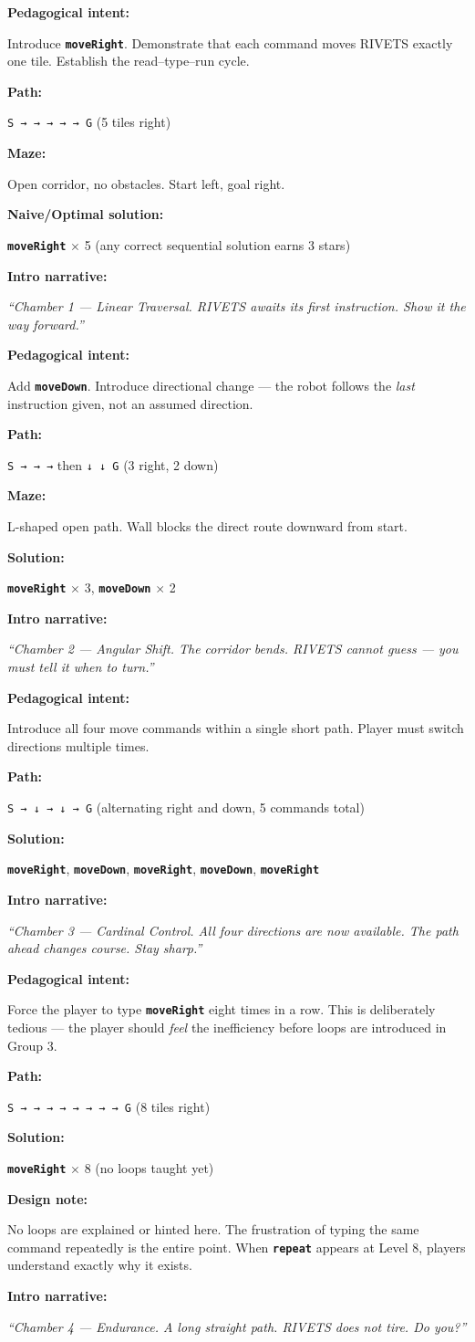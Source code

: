\documentclass[12pt,a4paper]{article}
\newcommand{\keyword}[1]{\textcolor{keyword}{\texttt{\bfseries #1}}}
\newcommand{\gddfield}[2]{%
  \noindent\begin{minipage}[t]{3.5cm}\bfseries\color{accent}\sffamily#1\end{minipage}%
  \hspace{8pt}%
  \begin{minipage}[t]{\dimexpr\linewidth-3.5cm-8pt\relax}%
    #2
  \end{minipage}\par\smallskip}
\begin{document}
\begin{tcolorbox}[gddbox, title={Level 1 — Straight Shot}]
\gddfield{Pedagogical intent:}{Introduce \keyword{moveRight}. Demonstrate that each command moves RIVETS exactly one tile. Establish the read--type--run cycle.}
\gddfield{Path:}{\texttt{S → → → → → G} (5 tiles right)}
\gddfield{Maze:}{Open corridor, no obstacles. Start left, goal right.}
\gddfield{Naive/Optimal solution:}{\keyword{moveRight} $\times$ 5 (any correct sequential solution earns 3 stars)}
\gddfield{Intro narrative:}{\emph{``Chamber 1 — Linear Traversal. RIVETS awaits its first instruction. Show it the way forward.''}}
\end{tcolorbox}

\begin{tcolorbox}[gddbox, title={Level 2 — Corridor Turn}]
\gddfield{Pedagogical intent:}{Add \keyword{moveDown}. Introduce directional change — the robot follows the \emph{last} instruction given, not an assumed direction.}
\gddfield{Path:}{\texttt{S → → →} then \texttt{↓ ↓ G} (3 right, 2 down)}
\gddfield{Maze:}{L-shaped open path. Wall blocks the direct route downward from start.}
\gddfield{Solution:}{\keyword{moveRight} $\times$ 3, \keyword{moveDown} $\times$ 2}
\gddfield{Intro narrative:}{\emph{``Chamber 2 — Angular Shift. The corridor bends. RIVETS cannot guess — you must tell it when to turn.''}}
\end{tcolorbox}

\begin{tcolorbox}[gddbox, title={Level 3 — Four Directions}]
\gddfield{Pedagogical intent:}{Introduce all four move commands within a single short path. Player must switch directions multiple times.}
\gddfield{Path:}{\texttt{S → ↓ → ↓ → G} (alternating right and down, 5 commands total)}
\gddfield{Solution:}{\keyword{moveRight}, \keyword{moveDown}, \keyword{moveRight}, \keyword{moveDown}, \keyword{moveRight}}
\gddfield{Intro narrative:}{\emph{``Chamber 3 — Cardinal Control. All four directions are now available. The path ahead changes course. Stay sharp.''}}
\end{tcolorbox}

\begin{tcolorbox}[gddbox, title={Level 4 — Long March}]
\gddfield{Pedagogical intent:}{Force the player to type \keyword{moveRight} eight times in a row. This is deliberately tedious — the player should \emph{feel} the inefficiency before loops are introduced in Group 3.}
\gddfield{Path:}{\texttt{S → → → → → → → → G} (8 tiles right)}
\gddfield{Solution:}{\keyword{moveRight} $\times$ 8 (no loops taught yet)}
\gddfield{Design note:}{No loops are explained or hinted here. The frustration of typing the same command repeatedly is the entire point. When \keyword{repeat} appears at Level 8, players understand exactly why it exists.}
\gddfield{Intro narrative:}{\emph{``Chamber 4 — Endurance. A long straight path. RIVETS does not tire. Do you?''}}
\end{tcolorbox}
\end{document}
